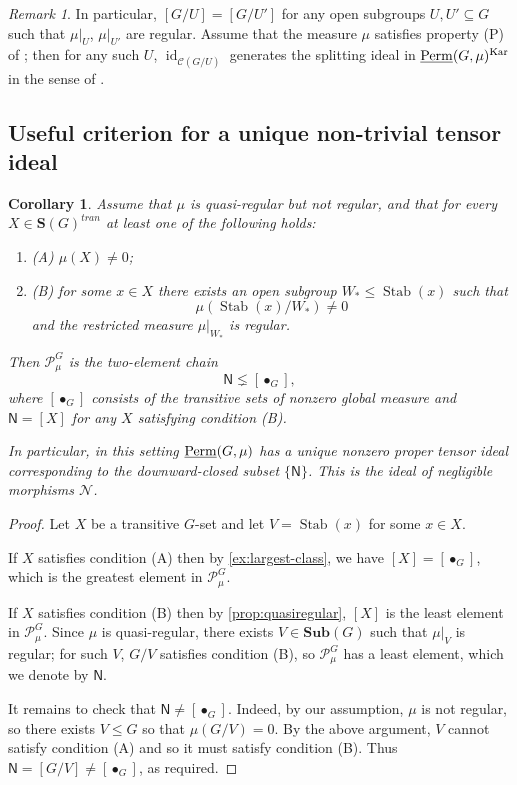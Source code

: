 \documentclass[11pt,a4paper]{amsart}
\theoremstyle{plain}%
\newtheorem{corollary}[lemma]{Corollary}
\theoremstyle{definition}
\theoremstyle{remark}
\newtheorem{remark}[lemma]{Remark}
\newcommand{\id}{\operatorname{id}}
\newcommand{\Perm}{\underline{{\rm Perm}}}
\newcommand{\Kar}{\mathrm{Kar}}
\newcommand{\Stab}{\operatorname{Stab}}
\newcommand{\N}{\mathcal N}
\newcommand{\Sub}{\mathbf{Sub}}
\newcommand{\Set}[1]{\mathbf{S}(#1)}
\begin{document}
\begin{remark}
     In particular, $[G/U]=[G/U']$ for any open subgroups $U, U'\subseteq G$ such that $\mu|_U$, $\mu|_{U'}$ {are} regular. Assume that the measure $\mu$ satisfies property (P) of \cite[Definition 7.10]{HS-oligomorphic}; then for any such $U$, $\id_{\mathcal{C}(G/U)}$ generates the splitting ideal in $\Perm(G, \mu)^{\Kar}$ in the sense of \cite[Definition 2.2]{BEO}.   



\end{remark}

\subsection{Useful criterion for a unique non-trivial tensor ideal}
\begin{corollary}\label{cor:two-class}
Assume that $\mu$ is quasi-regular but not regular, and that for every $X\in \Set{G}^{tran}$ at least one of the following holds:
\begin{enumerate}[label=\textup{}]
\item (A) 
$ \mu(X)\neq0$;
\item (B) for some $x\in X$ there exists an open subgroup ${W_*}\leq \Stab(x)$ such that
\[
 \mu(\Stab(x)/W_*)\neq0
\]
and the restricted measure $\mu|_{W_*}$ is regular.
\end{enumerate}
Then $\mathcal{P}^G_\mu$ is the two-element chain
\[
 \mathsf N\lneq[\bullet_G],
\]
where $[\bullet_G]$ consists of the transitive sets of nonzero global measure and $\mathsf N = [X] $ for any $X$ satisfying condition (B). 

In particular, in this setting $\Perm(G, 
\mu)$ has a unique nonzero proper tensor ideal corresponding to the downward-closed subset $\{\mathsf N\}$. This is the ideal of negligible morphisms $\N$.
\end{corollary}

\begin{proof} Let $X$ be a transitive $G$-set and let $V=\Stab(x)$ for some $x\in X$.

If $X$ satisfies condition (A) then by \cref{ex:largest-class}, we have $[X]=  [\bullet_G]$, which is the greatest element in $ \mathcal{P}^G_\mu$.

If $X$ satisfies condition (B) then by \cref{prop:quasiregular}, $[X]$ is the least element in $ \mathcal{P}^G_\mu$. Since $\mu$ is quasi-regular, there exists $V\in \Sub(G)$ such that $\mu|_{V}$ is regular; for such $V$, $G/{V}$ satisfies condition (B), so $ \mathcal{P}^G_\mu$ has a least element, which we denote by $\mathsf N$.

It remains to check that $ \mathsf N\neq[\bullet_G]$. Indeed, by our assumption, $\mu$ is not regular, so there exists $V\leq G$ so that $\mu(G/V){=} 0$. By the above argument, $V$ cannot satisfy condition (A) and so it must satisfy condition (B). Thus $\mathsf N=[G/V]\neq[\bullet_G]$, as required.
\end{proof}
\end{document}
